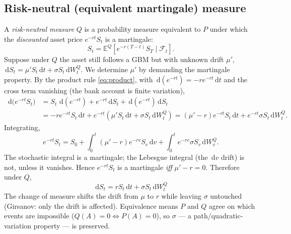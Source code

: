 \documentclass[11pt]{article}
\newcommand{\E}{\mathbb{E}}
\newcommand{\dd}{\,\mathrm{d}}
\begin{document}
\subsection{Risk-neutral (equivalent martingale) measure}
A \emph{risk-neutral measure} $Q$ is a probability measure equivalent to $P$ under which the
\emph{discounted} asset price $e^{-rt}S_t$ is a martingale:
\begin{equation}
S_t = \E^{Q}\!\left[e^{-r(T-t)} S_T \mid \mathcal F_t\right].
\end{equation}
Suppose under $Q$ the asset still follows a GBM but with unknown drift $\mu'$,
$\dd S_t = \mu' S_t \dd t + \sigma S_t \dd W_t^Q$. We determine $\mu'$ by demanding the martingale
property. By the product rule \eqref{eq:product}, with $\dd(e^{-rt}) = -r e^{-rt}\dd t$ and the
cross term vanishing (the bank account is finite variation),
\begin{align}
\dd\bigl(e^{-rt}S_t\bigr)
&= S_t\,\dd(e^{-rt}) + e^{-rt}\dd S_t + \dd(e^{-rt})\dd S_t \nonumber\\
&= -r e^{-rt}S_t\dd t + e^{-rt}(\mu' S_t\dd t + \sigma S_t\dd W_t^Q)
= (\mu'-r)e^{-rt}S_t\dd t + e^{-rt}\sigma S_t \dd W_t^Q.
\end{align}
Integrating,
\begin{equation}
e^{-rt}S_t = S_0 + \int_0^t (\mu'-r)e^{-rv}S_v\dd v + \int_0^t e^{-rv}\sigma S_v \dd W_v^Q.
\end{equation}
The stochastic integral is a martingale; the Lebesgue integral (the $\dd v$ drift) is not, unless it
vanishes. Hence $e^{-rt}S_t$ is a martingale \emph{iff} $\mu' - r = 0$. Therefore under $Q$,
\begin{equation}\label{eq:Qdyn}
\boxed{\;\dd S_t = r S_t \dd t + \sigma S_t \dd W_t^Q\;}
\end{equation}
The change of measure shifts the drift from $\mu$ to $r$ while leaving $\sigma$ untouched (Girsanov:
only the drift is affected). Equivalence means $P$ and $Q$ agree on which events are impossible
($Q(A)=0 \Leftrightarrow P(A)=0$), so $\sigma$ --- a path/quadratic-variation property --- is
preserved.
\end{document}
